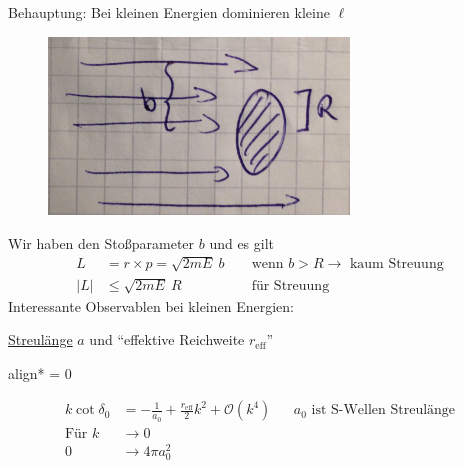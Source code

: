 	Behauptung: Bei kleinen Energien dominieren kleine $\ell$
	
	\begin{figure} [h]
		\begin{center}
			\includegraphics[width=8cm]{Stat_Streuproblem_Wirkungsquerschnitt9}
		\end{center}
	\end{figure}
\FloatBarrier
	Wir haben den Stoßparameter $b$ und es gilt
		\begin{align*}
			L &= r \times p = \sqrt{2mE} ~b & &\text{ wenn } b > R \rightarrow \text{ kaum Streuung} \\
			|L| &\leq \sqrt{2 m E} ~R & &\text{ für Streuung}
		\end{align*}
	Interessante Observablen bei kleinen Energien:
	
	\underline{Streulänge} $a$ und ``effektive Reichweite $r_{\text{eff}}$''
		\begin{empheq}[box=\boxed]{align*}
			\ell = 0
		\end{empheq}
		\begin{align*}
			k \cot \delta_0 &= 
			-\frac{1}{a_0} + \frac{r_{\text{eff}}}{2} k^2 + \mathscr{O}(k^4) 
			& &a_0 \text{ ist S-Wellen Streulänge} \\
			\text{Für } k &\rightarrow 0 \\
			0 &\rightarrow 4\pi a_0^2
		\end{align*}